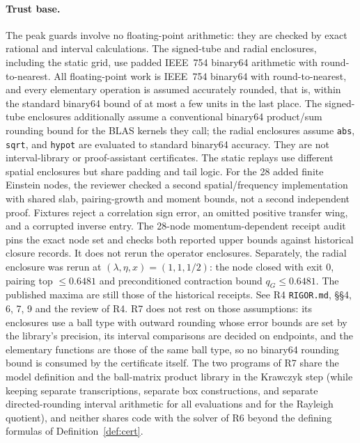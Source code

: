 \documentclass[11pt]{article}
\theoremstyle{definition}
\theoremstyle{remark}
\begin{document}
\paragraph{Trust base.} The peak guards involve no floating-point arithmetic: they are checked by exact rational and interval calculations. The signed-tube and radial enclosures, including the static grid, use padded IEEE~754 binary64 arithmetic with round-to-nearest. All floating-point work is IEEE~754 binary64 with round-to-nearest, and every elementary operation is assumed accurately rounded, that is, within the standard binary64 bound of at most a few units in the last place. The signed-tube enclosures additionally assume a conventional binary64 product/sum rounding bound for the BLAS kernels they call; the radial enclosures assume \texttt{abs}, \texttt{sqrt}, and \texttt{hypot} are evaluated to standard binary64 accuracy. They are not interval-library or proof-assistant certificates. The static replays use different spatial enclosures but share padding and tail logic. For the 28 added finite Einstein nodes, the reviewer checked a second spatial/frequency implementation with shared slab, pairing-growth and moment bounds, not a second independent proof. Fixtures reject a correlation sign error, an omitted positive transfer wing, and a corrupted inverse entry. The 28-node momentum-dependent receipt audit pins the exact node set and checks both reported upper bounds against historical closure records. It does not rerun the operator enclosures. Separately, the radial enclosure was rerun at $(\lambda,\eta,x)=(1,1,1/2)$: the node closed with exit 0, pairing top $\le0.6481$ and preconditioned contraction bound $q_G\le0.6481$. The published maxima are still those of the historical receipts. See R4 \texttt{RIGOR.md}, \S\S4, 6, 7, 9 and the review of R4. R7 does not rest on those assumptions: its enclosures use a ball type with outward rounding whose error bounds are set by the library's precision, its interval comparisons are decided on endpoints, and the elementary functions are those of the same ball type, so no binary64 rounding bound is consumed by the certificate itself. The two programs of R7 share the model definition and the ball-matrix product library in the Krawczyk step (while keeping separate transcriptions, separate box constructions, and separate directed-rounding interval arithmetic for all evaluations and for the Rayleigh quotient), and neither shares code with the solver of R6 beyond the defining formulas of Definition~\ref{def:cert}.

\end{document}

